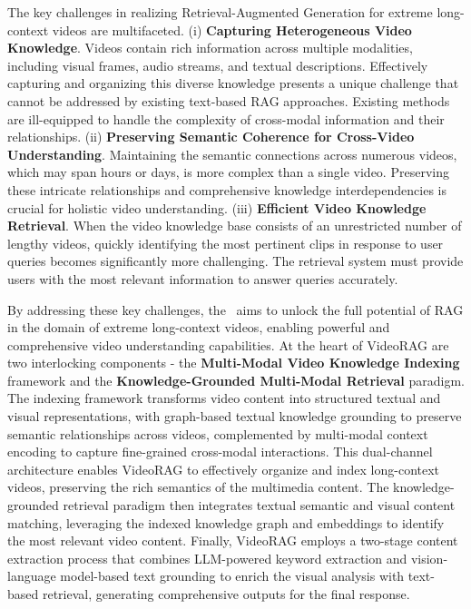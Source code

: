 The key challenges in realizing Retrieval-Augmented Generation for extreme long-context videos are multifaceted. (i) \textbf{Capturing Heterogeneous Video Knowledge}. Videos contain rich information across multiple modalities, including visual frames, audio streams, and textual descriptions. Effectively capturing and organizing this diverse knowledge presents a unique challenge that cannot be addressed by existing text-based RAG approaches. Existing methods are ill-equipped to handle the complexity of cross-modal information and their relationships. (ii) \textbf{Preserving Semantic Coherence for Cross-Video Understanding}. Maintaining the semantic connections across numerous videos, which may span hours or days, is more complex than a single video. Preserving these intricate relationships and comprehensive knowledge interdependencies is crucial for holistic video understanding. (iii) \textbf{Efficient Video Knowledge Retrieval}. When the video knowledge base consists of an unrestricted number of lengthy videos, quickly identifying the most pertinent clips in response to user queries becomes significantly more challenging. The retrieval system must provide users with the most relevant information to answer queries accurately.

By addressing these key challenges, the \model\ aims to unlock the full potential of RAG in the domain of extreme long-context videos, enabling powerful and comprehensive video understanding capabilities. At the heart of VideoRAG are two interlocking components - the \textbf{Multi-Modal Video Knowledge Indexing} framework and the \textbf{Knowledge-Grounded Multi-Modal Retrieval} paradigm. The indexing framework transforms video content into structured textual and visual representations, with graph-based textual knowledge grounding to preserve semantic relationships across videos, complemented by multi-modal context encoding to capture fine-grained cross-modal interactions. This dual-channel architecture enables VideoRAG to effectively organize and index long-context videos, preserving the rich semantics of the multimedia content. The knowledge-grounded retrieval paradigm then integrates textual semantic and visual content matching, leveraging the indexed knowledge graph and embeddings to identify the most relevant video content. Finally, VideoRAG employs a two-stage content extraction process that combines LLM-powered keyword extraction and vision-language model-based text grounding to enrich the visual analysis with text-based retrieval, generating comprehensive outputs for the final response.

